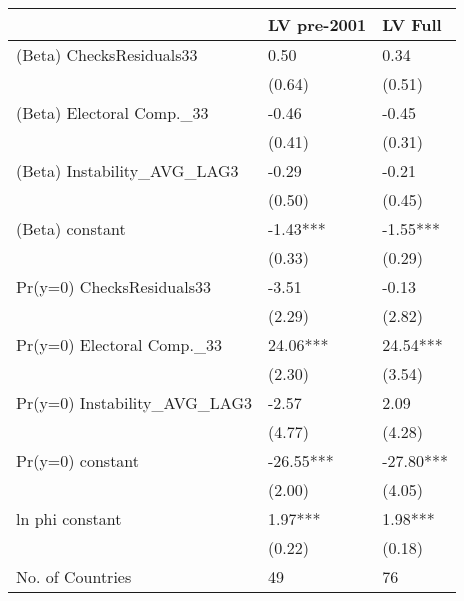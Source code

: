 {\scriptsize
\begin{tabular}{lll}
  \hline
 & LV pre-2001 & LV Full \\ 
  \hline
(Beta) ChecksResiduals33 & 0.50 & 0.34 \\ 
   & (0.64) & (0.51) \\ 
  (Beta) Electoral Comp.\_33 & -0.46 & -0.45 \\ 
   & (0.41) & (0.31) \\ 
  (Beta) Instability\_AVG\_LAG3 & -0.29 & -0.21 \\ 
   & (0.50) & (0.45) \\ 
  (Beta) constant & -1.43*** & -1.55*** \\ 
   & (0.33) & (0.29) \\ 
  Pr(y=0) ChecksResiduals33 & -3.51 & -0.13 \\ 
   & (2.29) & (2.82) \\ 
  Pr(y=0) Electoral Comp.\_33 & 24.06*** & 24.54*** \\ 
   & (2.30) & (3.54) \\ 
  Pr(y=0) Instability\_AVG\_LAG3 & -2.57 & 2.09 \\ 
   & (4.77) & (4.28) \\ 
  Pr(y=0) constant & -26.55*** & -27.80*** \\ 
   & (2.00) & (4.05) \\ 
  ln phi constant & 1.97*** & 1.98*** \\ 
   & (0.22) & (0.18) \\ 
  No. of Countries & 49 & 76 \\ 
   \hline
\end{tabular}
}
